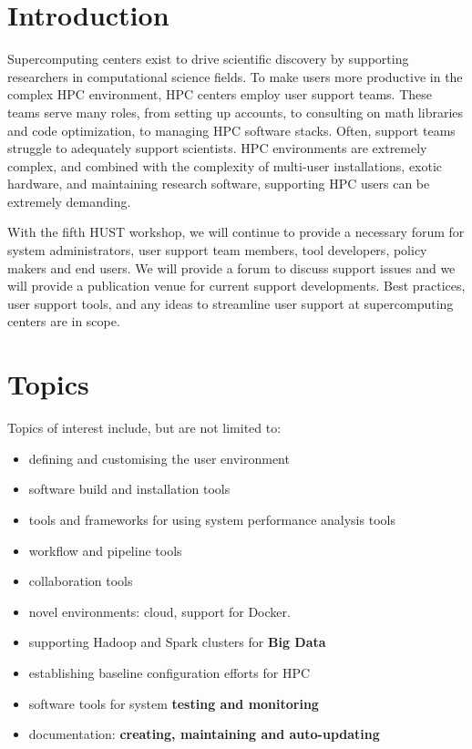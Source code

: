 \documentclass[11pt,a4paper]{article}
\begin{document}
\parindent 0pt
\parskip 6pt
\pagebreak
\section{Introduction}

Supercomputing centers exist to drive scientific discovery by supporting researchers in 
computational science fields.  To make users more productive in the complex HPC
environment, HPC centers employ user support teams.  These teams
serve many roles, from setting up accounts, to consulting on math libraries and code
optimization, to managing HPC software stacks.
Often, support teams struggle to adequately support scientists.
HPC environments are extremely complex, and combined with
the complexity of multi-user installations, exotic hardware, and maintaining
research software, supporting HPC users can be extremely demanding.

With the fifth HUST workshop, we will continue to provide a necessary forum for 
system administrators, user support team members, tool developers, policy makers and
end users.  We will provide a forum to discuss support issues and we will
provide a publication venue for current support developments.  Best practices,
user support tools, and any ideas to streamline user support at supercomputing
centers are in scope.

\section{Topics}

Topics of interest include, but are not limited to:

\begin{itemize}
\item defining and customising the user environment
\item software build and installation tools
\item tools and frameworks for using system performance analysis tools
\item workflow and pipeline tools
\item collaboration tools
\item novel environments: cloud, support for Docker.
\item supporting Hadoop and Spark clusters for {\bf Big Data}
\item establishing baseline configuration efforts for HPC
\item software tools for system {\bf testing and monitoring}
\item documentation: {\bf creating, maintaining and auto-updating}
\end{itemize}
\end{document}
